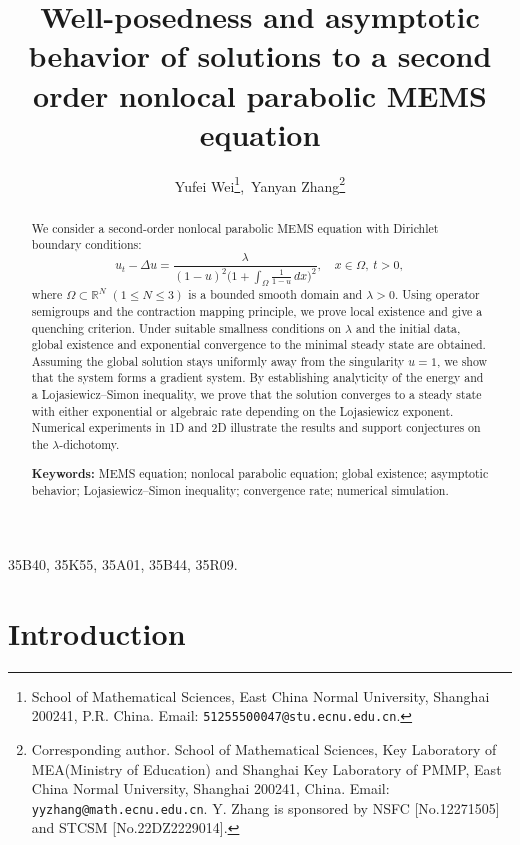 \documentclass{article}
\numberwithin{equation}{section}
\begin{document}
	\title{Well-posedness and asymptotic behavior of solutions to a second order nonlocal parabolic MEMS equation}


 \author{Yufei Wei\thanks{School of Mathematical Sciences, East China Normal University, Shanghai 200241,   P.R. China. Email: \texttt{51255500047@stu.ecnu.edu.cn}. },\,
 Yanyan Zhang\thanks{Corresponding author. School of Mathematical Sciences,  Key Laboratory of MEA(Ministry of Education) and Shanghai Key Laboratory of PMMP,  East China Normal University, Shanghai 200241, China. Email: \texttt{yyzhang@math.ecnu.edu.cn}. Y. Zhang is sponsored by
  NSFC [No.12271505] and
  STCSM  [No.22DZ2229014].}}
\date{}

\maketitle
\begin{abstract}
We consider a second-order nonlocal parabolic MEMS equation with Dirichlet boundary conditions:
\[
u_t-\Delta u=\frac{\lambda}{(1-u)^2\bigl(1+\int_\Omega\frac{1}{1-u}\,dx\bigr)^2},\quad x\in\Omega,\ t>0,
\]
where \(\Omega\subset\mathbb{R}^N\) \((1\le N\le3)\) is a bounded smooth domain and \(\lambda>0\). Using operator semigroups and the contraction mapping principle, we prove local existence and give a quenching criterion. Under suitable smallness conditions on \(\lambda\) and the initial data, global existence and exponential convergence to the minimal steady state are obtained. Assuming the global solution stays uniformly away from the singularity \(u=1\), we show that the system forms a gradient system. By establishing analyticity of the energy and a Lojasiewicz--Simon inequality, we prove that the solution converges to a steady state with either exponential or algebraic rate depending on the Lojasiewicz exponent. Numerical experiments in 1D and 2D illustrate the results and support conjectures on the \(\lambda\)-dichotomy.

\noindent\textbf{Keywords:} MEMS equation; nonlocal parabolic equation; global existence; asymptotic behavior; Lojasiewicz–Simon inequality; convergence rate; numerical simulation.
\end{abstract}

 35B40, 35K55, 35A01, 35B44, 35R09.
\section{Introduction}
\end{document}
